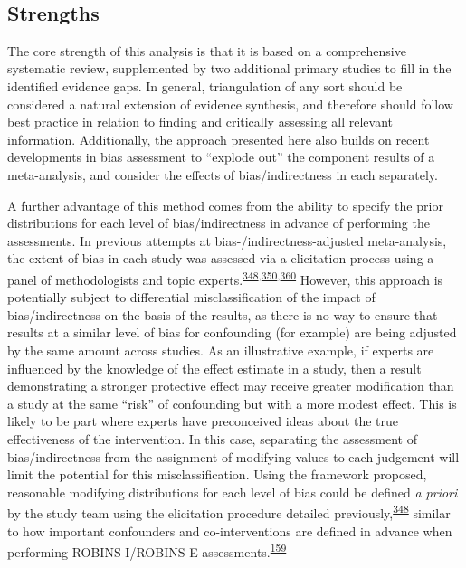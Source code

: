 \documentclass[a4paper, twoside]{templates/ociamthesis}
\begin{document}
~

\hypertarget{strengths-2}{%
\subsection{Strengths}\label{strengths-2}}

The core strength of this analysis is that it is based on a comprehensive systematic review, supplemented by two additional primary studies to fill in the identified evidence gaps. In general, triangulation of any sort should be considered a natural extension of evidence synthesis, and therefore should follow best practice in relation to finding and critically assessing all relevant information. Additionally, the approach presented here also builds on recent developments in bias assessment to ``explode out'' the component results of a meta-analysis, and consider the effects of bias/indirectness in each separately.

A further advantage of this method comes from the ability to specify the prior distributions for each level of bias/indirectness in advance of performing the assessments. In previous attempts at bias-/indirectness-adjusted meta-analysis, the extent of bias in each study was assessed via a elicitation process using a panel of methodologists and topic experts.\textsuperscript{\protect\hyperlink{ref-turner2009}{348},\protect\hyperlink{ref-thompson2011}{350},\protect\hyperlink{ref-wilks2011}{360}} However, this approach is potentially subject to differential misclassification of the impact of bias/indirectness on the basis of the results, as there is no way to ensure that results at a similar level of bias for confounding (for example) are being adjusted by the same amount across studies. As an illustrative example, if experts are influenced by the knowledge of the effect estimate in a study, then a result demonstrating a stronger protective effect may receive greater modification than a study at the same ``risk'' of confounding but with a more modest effect. This is likely to be part where experts have preconceived ideas about the true effectiveness of the intervention. In this case, separating the assessment of bias/indirectness from the assignment of modifying values to each judgement will limit the potential for this misclassification. Using the framework proposed, reasonable modifying distributions for each level of bias could be defined \emph{a priori} by the study team using the elicitation procedure detailed previously,\textsuperscript{\protect\hyperlink{ref-turner2009}{348}} similar to how important confounders and co-interventions are defined in advance when performing ROBINS-I/ROBINS-E assessments.\textsuperscript{\protect\hyperlink{ref-sterne2016}{159}}
\end{document}
